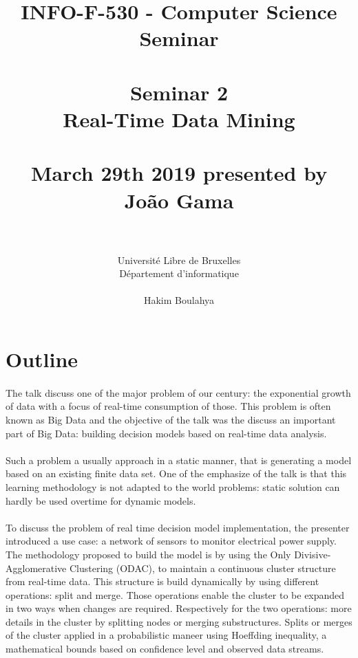 \documentclass[11pt,a4paper]{article}
\begin{document}

\title{
\large INFO-F-530 - Computer Science Seminar \\~\\
\LARGE Seminar 2 \\ Real-Time Data Mining \\~\\
\Large March 29th 2019 presented by João Gama \\~\\}
\author{Université Libre de Bruxelles \\
Département d'informatique \\
\\ Hakim Boulahya}
\maketitle

\setcounter{section}{0}

\section{Outline}

\paragraph{}

The talk discuss one of the major problem of our century: the exponential growth of data with a focus of real-time consumption of those. This problem is often known as Big Data and the objective of the talk was the discuss an important part of Big Data: building decision models based on real-time data analysis.

\paragraph{}

Such a problem a usually approach in a static manner, that is generating a model based on an existing finite data set. One of the emphasize of the talk is that this learning methodology is not adapted to the world problems: static solution can hardly be used overtime for dynamic models.

\paragraph{}

To discuss the problem of real time decision model implementation, the presenter introduced a use case: a network of sensors to monitor electrical power supply. The methodology proposed to build the model is by using the Only Divisive-Agglomerative Clustering (ODAC), to maintain a continuous cluster structure from real-time data. This structure is build dynamically by using different operations: split and merge. Those operations enable the cluster to be expanded in two ways when changes are required. Respectively for the two operations: more details in the cluster by splitting nodes or merging substructures. Splits or merges of the cluster applied in a probabilistic maneer using Hoeffding inequality, a mathematical bounds based on confidence level and observed data streams.
\end{document}
